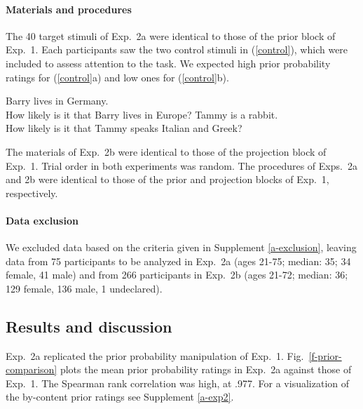 \documentclass[11pt,fleqn]{article}
\newcommand{\figref}[1]{Fig.~\ref{#1}}
\newcommand{\6}{\mbox{$[\hspace*{-.6mm}[$}}
\newcommand{\9}{\mbox{$]\hspace*{-.6mm}]$}}
\begin{document}
\paragraph{Materials and procedures} The 40 target stimuli of Exp.~2a were identical to those of the prior block of Exp.~1. Each participants saw the two control stimuli in (\ref{control}), which were included to assess attention to the task. We expected high prior probability ratings for (\ref{control}a) and low ones for (\ref{control}b). 

\begin{exe}
\ex\label{control2}
\begin{xlist}
 Barry lives in Germany. \\ How likely is it that Barry lives in Europe?
 Tammy is a rabbit. \\ How likely is it that Tammy speaks Italian and Greek?
\end{xlist}
\end{exe}
The materials of Exp.~2b were identical to those of the projection block of Exp.~1. Trial order in both experiments was random. The procedures of Exps.~2a and 2b were identical to those of the prior and projection blocks of Exp.~1, respectively.

\paragraph{Data exclusion} We excluded data based on the criteria given in Supplement \ref{a-exclusion}, leaving data from 75 participants to be analyzed in Exp.~2a (ages 21-75; median: 35; 34 female, 41 male) and from 266 participants in Exp.~2b (ages 21-72; median: 36; 129 female, 136 male, 1 undeclared).

\subsection{Results and discussion}

Exp.~2a replicated the prior probability manipulation of Exp.~1.  \figref{f-prior-comparison} plots the mean prior probability ratings in Exp.~2a against those of Exp.~1. The Spearman rank correlation was high, at .977. For a visualization of the by-content prior ratings see Supplement \ref{a-exp2}.
\end{document}
